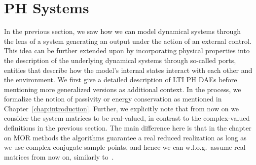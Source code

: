 \section{\acl{PH} Systems}\label{sec:phltis}

In the previous section, we saw how we can model dynamical systems through the lens of a system generating an output under the action of an external control.
This idea can be further extended upon by incorporating physical properties into the description of the underlying dynamical systems through so-called ports, entities that describe how the model's internal states interact with each other and the environment.
We first give a detailed description of \ac{LTI} \ac{PH} \acp{DAE} before mentioning more generalized versions as additional context.
In the process, we formalize the notion of passivity or energy conservation as mentioned in Chapter~\ref{chap:introduction}.
Further, we explicitly note that from now on we consider the system matrices to be real-valued, in contrast to the complex-valued definitions in the previous section.
The main difference here is that in the chapter on \ac{MOR} methods the algorithms guarantee a real reduced realization as long as we use complex conjugate sample points, and hence we can w.l.o.g.\ assume real matrices from now on, similarly to~\cite{Gugercin2008}.

